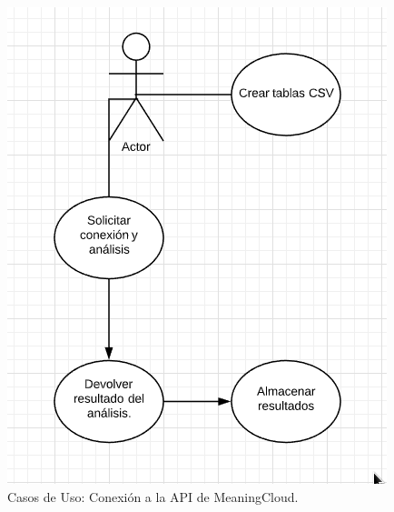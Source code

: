 \begin{figure}[H]
	\centering
	\includegraphics[scale=.4]{imagenes/casoUso2.png}
	\caption{Casos de Uso: Conexión a la API de MeaningCloud.}
	\label{fig:casoUso2}
\end{figure}
